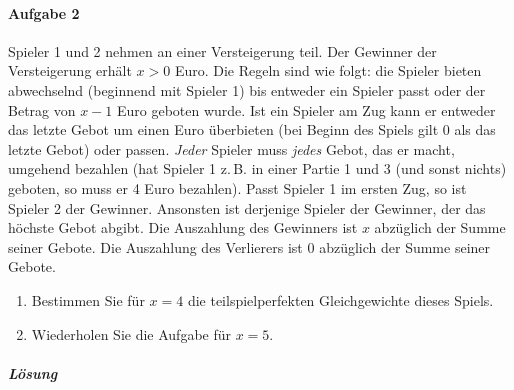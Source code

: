\paragraph{Aufgabe 2}%
\label{par:serie_7_aufgabe_2}

Spieler 1 und 2 nehmen an einer Versteigerung teil.
Der Gewinner der Versteigerung erhält $x > 0$ Euro.
Die Regeln sind wie folgt: die Spieler bieten abwechselnd (beginnend mit Spieler 1) bis
entweder ein Spieler passt oder der Betrag von $x-1$ Euro geboten wurde.
Ist ein Spieler am Zug kann er entweder das letzte Gebot um einen Euro überbieten (bei
Beginn des Spiels gilt 0 als das letzte Gebot) oder passen.
\emph{Jeder} Spieler muss \emph{jedes} Gebot, das er macht, umgehend bezahlen
(hat Spieler 1 z.\,B. in einer Partie 1 und 3 (und sonst nichts) geboten, so muss er 4
Euro bezahlen).
Passt Spieler 1 im ersten Zug, so ist Spieler 2 der Gewinner.
Ansonsten ist derjenige Spieler der Gewinner, der das höchste Gebot abgibt.
Die Auszahlung des Gewinners ist $x$ abzüglich der Summe seiner Gebote.
Die Auszahlung des Verlierers ist $0$ abzüglich der Summe seiner Gebote.

\begin{enumerate}
  \item Bestimmen Sie für $x=4$ die teilspielperfekten Gleichgewichte dieses Spiels.
  \item Wiederholen Sie die Aufgabe für $x=5$.
\end{enumerate}

\subparagraph{Lösung}%

